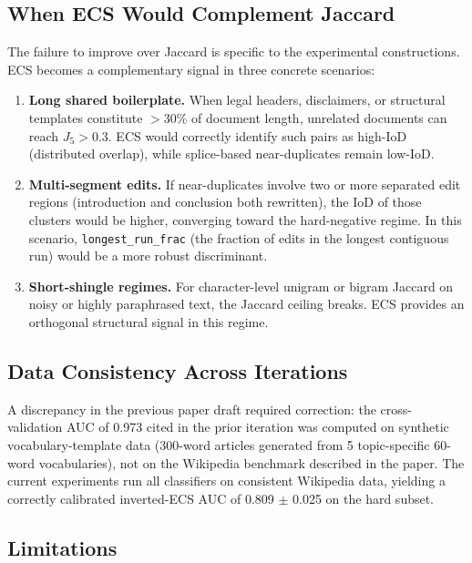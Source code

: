 \documentclass[11pt,letterpaper]{article}
\begin{document}
\subsection{When ECS Would Complement Jaccard}

The failure to improve over Jaccard is specific to the experimental constructions. ECS becomes a complementary signal in three concrete scenarios:

\begin{enumerate}
    \item \textbf{Long shared boilerplate.} When legal headers, disclaimers, or structural templates constitute $>$30\% of document length, unrelated documents can reach $J_5 > 0.3$. ECS would correctly identify such pairs as high-IoD (distributed overlap), while splice-based near-duplicates remain low-IoD.

    \item \textbf{Multi-segment edits.} If near-duplicates involve two or more separated edit regions (introduction and conclusion both rewritten), the IoD of those clusters would be higher, converging toward the hard-negative regime. In this scenario, \texttt{longest\_run\_frac} (the fraction of edits in the longest contiguous run) would be a more robust discriminant.

    \item \textbf{Short-shingle regimes.} For character-level unigram or bigram Jaccard on noisy or highly paraphrased text, the Jaccard ceiling breaks. ECS provides an orthogonal structural signal in this regime.
\end{enumerate}

\subsection{Data Consistency Across Iterations}

A discrepancy in the previous paper draft required correction: the cross-validation AUC of 0.973 cited in the prior iteration was computed on synthetic vocabulary-template data (300-word articles generated from 5 topic-specific 60-word vocabularies), not on the Wikipedia benchmark described in the paper. The current experiments run all classifiers on consistent Wikipedia data, yielding a correctly calibrated inverted-ECS AUC of 0.809 $\pm$ 0.025 on the hard subset.

\subsection{Limitations}
\end{document}
